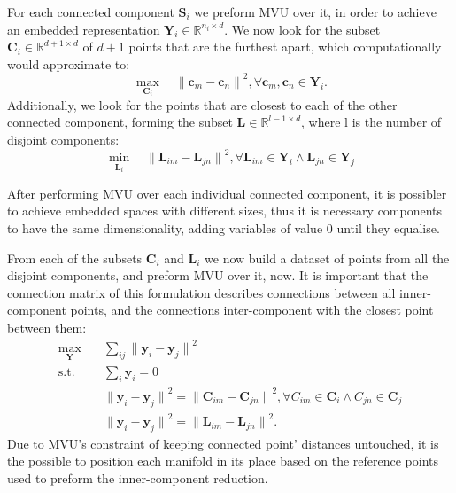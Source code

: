     For each connected component $\bm{S}_i$ we preform MVU over it, in order to achieve an embedded representation $\bm{Y}_i \in \mathbb{R}^{n_i \times d}$.
    We now look for the subset $\bm{C}_i \in \mathbb{R}^{d+1 \times d}$ of $d+1$ points that are the furthest apart, which computationally would approximate to:
    \begin{equation}
        \max_{\bm{C}_i} \quad {\| \bm{c}_m - \bm{c}_n \|}^2, \forall{\bm{c}_m,\bm{c}_n} \in \bm{Y}_i.
    \end{equation}
    Additionally, we look for the points that are closest to each of the other connected component, forming the subset $\bm{L}\in \mathbb{R}^{l-1\times d}$, where l is the number of disjoint components:
    \begin{equation}
        \min_{\bm{L}_i} \quad {\| \bm{L}_{im} - \bm{L}_{jn} \|}^2, \forall \bm{L}_{im} \in \bm{Y}_{i} \wedge \bm{L}_{jn} \in \bm{Y}_{j}
    \end{equation}

    After performing MVU over each individual connected component, it is possibler to achieve embedded spaces with different sizes, thus it is necessary components to have the same dimensionality, adding variables of value $0$ until they equalise. 

    From each of the subsets $\bm{C}_i$ and $\bm{L}_i$ we now build a dataset of points from all the disjoint components, and preform MVU over it, now. It is important that the connection matrix of this formulation describes connections between all inner-component points, and the connections inter-component with the closest point between them:
    \begin{align}
        \max_{\bm{Y}} \quad & \sum_{ij} {\| \bm{y}_i - \bm{y}_j \|}^2 \\
        \textrm{s.t.} \quad 
            & \sum_i \bm{y}_i = 0 \\
            & {\| \bm{y}_i - \bm{y}_j \|}^2 = {\| \bm{C}_{im} - \bm{C}_{jn} \|}^2, \forall{C}_{im} \in\bm{C}_i \wedge  {C}_{jn} \in\bm{C}_j \\
            & {\| \bm{y}_i - \bm{y}_j \|}^2 = {\| \bm{L}_{im} - \bm{L}_{jn} \|}^2.
    \end{align}
    Due to MVU's constraint of keeping connected point' distances untouched, it is the possible to position each manifold in its place based on the reference points used to preform the inner-component reduction.


